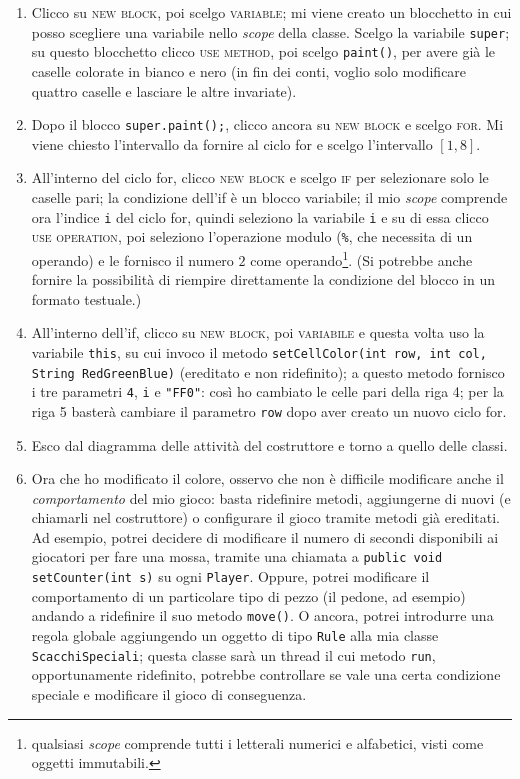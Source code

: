 \begin{enumerate}
	\item Clicco su \textsc{new block}, poi scelgo \textsc{variable}; mi viene creato un blocchetto in cui posso scegliere una variabile nello \emph{scope} della classe. Scelgo la variabile \texttt{super}; su questo blocchetto clicco \textsc{use method}, poi scelgo \texttt{paint()}, per avere già le caselle colorate in bianco e nero (in fin dei conti, voglio solo modificare quattro caselle e lasciare le altre invariate).
	\item Dopo il blocco \texttt{super.paint();}, clicco ancora su \textsc{new block} e scelgo \textsc{for}. Mi viene chiesto l'intervallo da fornire al ciclo for e scelgo l'intervallo $[1, 8]$.
	\item All'interno del ciclo for, clicco \textsc{new block} e scelgo \textsc{if} per selezionare solo le caselle pari; la condizione dell'if è un blocco variabile; il mio \emph{scope} comprende ora l'indice \texttt{i} del ciclo for, quindi seleziono la variabile \texttt{i} e su di essa clicco \textsc{use operation}, poi seleziono l'operazione modulo (\texttt{\%}, che necessita di un operando) e le fornisco il numero $2$ come operando\footnote{qualsiasi \emph{scope} comprende tutti i letterali numerici e alfabetici, visti come oggetti immutabili.}. (Si potrebbe anche fornire la possibilità di riempire direttamente la condizione del blocco in un formato testuale.) %
	\item All'interno dell'if, clicco su \textsc{new block}, poi \textsc{variabile} e questa volta uso la variabile \texttt{this}, su cui invoco il metodo \texttt{setCellColor(int row, int col, String RedGreenBlue)} (ereditato e non ridefinito); a questo metodo fornisco i tre parametri \texttt{4}, \texttt{i} e \texttt{"FF0"}: così ho cambiato le celle pari della riga 4; per la riga 5 basterà cambiare il parametro \texttt{row} dopo aver creato un nuovo ciclo for.
	\item Esco dal diagramma delle attività del costruttore e torno a quello delle classi.
	\item Ora che ho modificato il colore, osservo che non è difficile modificare anche il \emph{comportamento} del mio gioco: basta ridefinire metodi, aggiungerne di nuovi (e chiamarli nel costruttore) o configurare il gioco tramite metodi già ereditati. Ad esempio, potrei decidere di modificare il numero di secondi disponibili ai giocatori per fare una mossa, tramite una chiamata a \texttt{public void setCounter(int s)} su ogni \texttt{Player}. Oppure, potrei modificare il comportamento di un particolare tipo di pezzo (il pedone, ad esempio) andando a ridefinire il suo metodo \texttt{move()}. O ancora, potrei introdurre una regola globale aggiungendo un oggetto di tipo \texttt{Rule} alla mia classe \texttt{ScacchiSpeciali}; questa classe sarà un thread il cui metodo \texttt{run}, opportunamente ridefinito, potrebbe controllare se vale una certa condizione speciale e modificare il gioco di conseguenza.

\end{enumerate}
